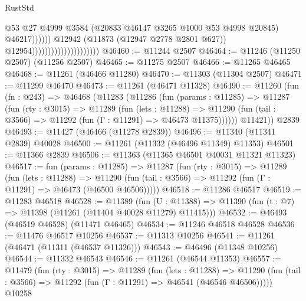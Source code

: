 \begin{lexlean}{RustStd}
\begin{coremodule}
                                                          @53
                                                          @27
                                                          @4999
                                                          @3584
                                                          (@20833
                                                            @46147
                                                            @3265
                                                            @1000
                                                            @53
                                                            @4998
                                                            @20845)
                                                          @46217))))))
                                              @12942
                                              (@11873 (@12947 @2778 @2801 @627))
                                              @12954)))))))))))))))))))))
@46460 := @11244 @2507
@46464 := @11246 (@11250 @2507) (@11256 @2507)
@46465 := @11275 @2507
@46466 := @11265 @46465
@46468 := @11261 (@46466 @11280)
@46470 := @11303 (@11304 @2507)
@46471 := @11299 @46470
@46473 := @11261 (@46471 @11328)
@46490 := @11260
    (fun (fn : @243) =>
    @46468
      (@11283
        (@11286
          (fun (params : @11285) =>
          @11287
            (fun (rty : @3015) =>
            @11289
              (fun (lets : @11288) =>
              @11290 (fun (tail : @3566) => @11292 (fun (Γ : @11291) => @46473 @11375))))))
        @11421))
    @2839
@46493 := @11427 (@46466 (@11278 @2839))
@46496 := @11340 (@11341 @2839) @40028
@46500 := @11261 (@11332 (@46496 @11349) @11353)
@46501 := @11366 @2839
@46506 := @11363 (@11365 @46501 @40031 @11321 @11323)
@46517 := fun (params : @11285) =>
  @11287
    (fun (rty : @3015) =>
    @11289
      (fun (lets : @11288) =>
      @11290 (fun (tail : @3566) => @11292 (fun (Γ : @11291) => @46473 (@46500 @46506)))))
@46518 := @11286 @46517
@46519 := @11283 @46518
@46528 := @11389
    (fun (U : @11388) => @11390 (fun (t : @7) => @11398 (@11261 (@11404 @40028 @11279) @11415)))
@46532 := @46493 (@46519 @46528) (@11471 @46465)
@46534 := @11246 @46518 @46528
@46536 := @11476 @46517 @10256
@46537 := @11313 @10256
@46541 := @11261 (@46471 (@11311 (@46537 @11326)))
@46543 := @46496 (@11348 @10256)
@46544 := @11332 @46543
@46546 := @11261 (@46544 @11353)
@46557 := @11479
    (fun (rty : @3015) =>
    @11289
      (fun (lets : @11288) =>
      @11290 (fun (tail : @3566) => @11292 (fun (Γ : @11291) => @46541 (@46546 @46506)))))
    @10258

\end{coremodule}
\end{lexlean}
